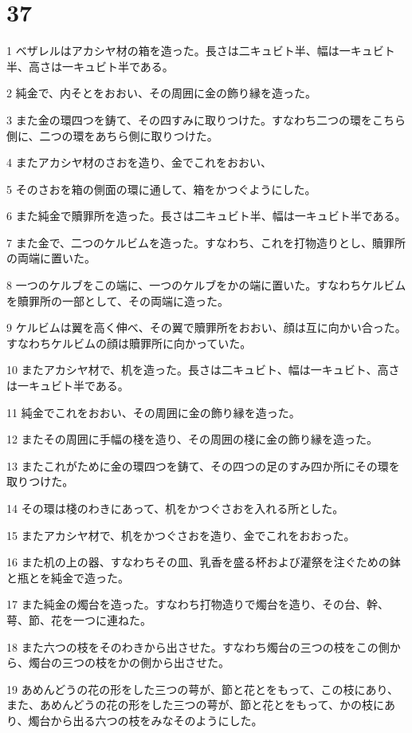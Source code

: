 \chapter{37}

\par 1 ベザレルはアカシヤ材の箱を造った。長さは二キュビト半、幅は一キュビト半、高さは一キュビト半である。
\par 2 純金で、内そとをおおい、その周囲に金の飾り縁を造った。
\par 3 また金の環四つを鋳て、その四すみに取りつけた。すなわち二つの環をこちら側に、二つの環をあちら側に取りつけた。
\par 4 またアカシヤ材のさおを造り、金でこれをおおい、
\par 5 そのさおを箱の側面の環に通して、箱をかつぐようにした。
\par 6 また純金で贖罪所を造った。長さは二キュビト半、幅は一キュビト半である。
\par 7 また金で、二つのケルビムを造った。すなわち、これを打物造りとし、贖罪所の両端に置いた。
\par 8 一つのケルブをこの端に、一つのケルブをかの端に置いた。すなわちケルビムを贖罪所の一部として、その両端に造った。
\par 9 ケルビムは翼を高く伸べ、その翼で贖罪所をおおい、顔は互に向かい合った。すなわちケルビムの顔は贖罪所に向かっていた。
\par 10 またアカシヤ材で、机を造った。長さは二キュビト、幅は一キュビト、高さは一キュビト半である。
\par 11 純金でこれをおおい、その周囲に金の飾り縁を造った。
\par 12 またその周囲に手幅の棧を造り、その周囲の棧に金の飾り縁を造った。
\par 13 またこれがために金の環四つを鋳て、その四つの足のすみ四か所にその環を取りつけた。
\par 14 その環は棧のわきにあって、机をかつぐさおを入れる所とした。
\par 15 またアカシヤ材で、机をかつぐさおを造り、金でこれをおおった。
\par 16 また机の上の器、すなわちその皿、乳香を盛る杯および灌祭を注ぐための鉢と瓶とを純金で造った。
\par 17 また純金の燭台を造った。すなわち打物造りで燭台を造り、その台、幹、萼、節、花を一つに連ねた。
\par 18 また六つの枝をそのわきから出させた。すなわち燭台の三つの枝をこの側から、燭台の三つの枝をかの側から出させた。
\par 19 あめんどうの花の形をした三つの萼が、節と花とをもって、この枝にあり、また、あめんどうの花の形をした三つの萼が、節と花とをもって、かの枝にあり、燭台から出る六つの枝をみなそのようにした。
